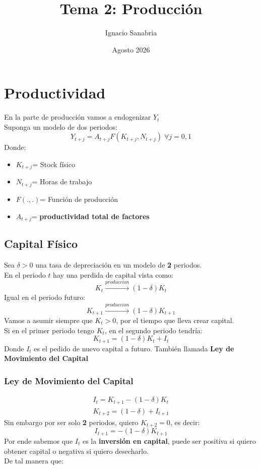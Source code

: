 \documentclass[12pt]{article}
\title{Tema 2: Producción}
\author{Ignacio Sanabria}
\date{Agosto 2026}
\begin{document}
\maketitle

\section{Productividad}
En la parte de producción vamos a endogenizar $Y_t$\\
Suponga un modelo de dos periodos: 
$$Y_{t+j}=A_{t+j}F(K_{t+j},N_{t+j})\; \forall j=0,1$$
Donde: 
\begin{itemize}
    \item $K_{t+j}$= Stock físico
    \item $N_{t+j}$= Horas de trabajo 
    \item $F(.,.)$= Función de producción 
    \item $A_{t+j}$= \textbf{productividad total de factores}
\end{itemize}

\subsection{Capital Físico}
Sea $\delta>0$ una tasa de depreciación en un modelo de \textbf{2} periodos. \\
En el periodo $t$ hay una perdida de capital vista como: \\
$$K_t \xrightarrow{produccion} (1-\delta)K_t $$
Igual en el periodo futuro: \\
$$K_{t+1} \xrightarrow{produccion} (1-\delta)K_{t+1} $$
Vamos a asumir siempre que $K_t>0$, por el tiempo que lleva crear capital. \\
Si en el primer periodo tengo $K_t$, en el segundo periodo tendría: 
$$K_{t+1}=(1-\delta)K_t+I_t$$
Donde $I_t$ es el pedido de nuevo capital a futuro. También llamada \textbf{Ley de Movimiento del Capital}\\
\subsubsection{Ley de Movimiento del Capital}
\begin{align*}
    I_t=K_{t+1}-(1-\delta)K_t\\
    K_{t+2}=(1-\delta)+I_{t+1}
\end{align*}
Sin embargo por ser solo \textbf{2} periodos, quiero $K_{t+2}=0$, es decir: \\
$$ I_{t+1}=-(1-\delta)K_{t+1}$$
Por ende sabemos que $I_t$ es la \textbf{inversión en capital}, puede ser positiva si quiero obtener capital o negativa si quiero desecharlo. \\
De tal manera que: 
\begin{figure} [H]
        \centering 
        
        \label{fig:placeholder}
\end{figure}
\newpage
\end{document}
